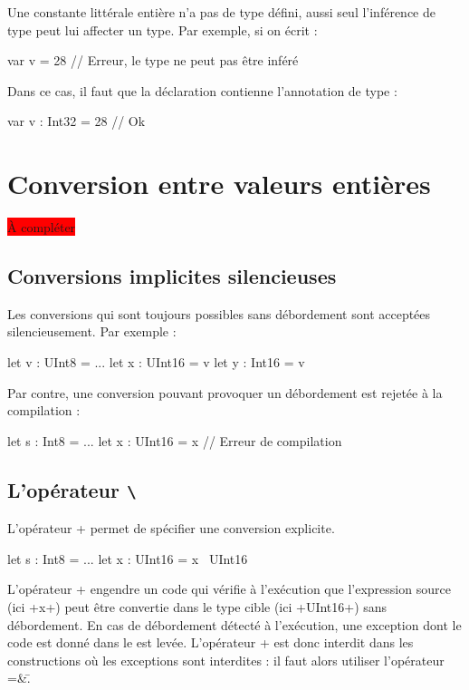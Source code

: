 Une constante littérale entière n'a pas de type défini, aussi seul l'inférence de type peut lui affecter un type. Par exemple, si on écrit :
\begin{PLM}
var v = 28 // Erreur, le type ne peut pas être inféré
\end{PLM}

Dans ce cas, il faut que la déclaration contienne l'annotation de type :
\begin{PLM}
var v : Int32 = 28 // Ok
\end{PLM}




\section{Conversion entre valeurs entières}

\colorbox{red}{À compléter}

\subsection{Conversions implicites silencieuses}
Les conversions qui sont toujours possibles sans débordement sont acceptées silencieusement. Par exemple :
\begin{PLM}
let v : UInt8 = ...
let x : UInt16 = v
let y : Int16 = v
\end{PLM}

Par contre, une conversion pouvant provoquer un débordement est rejetée à la compilation :
\begin{PLM}
let s : Int8 = ...
let x : UInt16 = x // Erreur de compilation
\end{PLM}

\subsection{L'opérateur \texttt{\textbackslash}}
L'opérateur \plm+\+ permet de spécifier une conversion explicite.

\begin{PLM}
let s : Int8 = ...
let x : UInt16 = x \ UInt16
\end{PLM}

L'opérateur \plm+\+ engendre un code qui vérifie à l'exécution que l'expression source (ici \plm+x+) peut être convertie dans le type cible (ici \plm+UInt16+) sans débordement. En cas de débordement détecté à l'exécution, une exception dont le code est donné dans le  est levée. L'opérateur \plm+\+ est donc interdit dans les constructions où les exceptions sont interdites : il faut alors utiliser l'opérateur \plm=&\=.

